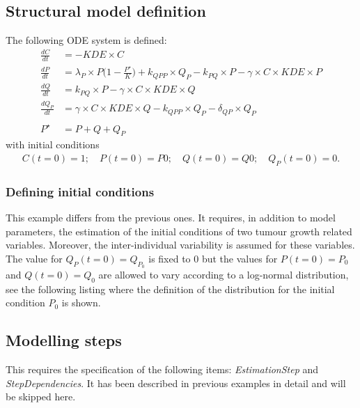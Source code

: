 \subsection{Structural model definition}
The following ODE system is defined:
\begin{align*}
\frac{dC}{dt} &= -\textit{KDE} \times C  \nonumber \\
\frac{dP}{dt} &= \lambda_P \times P \Big( 1 - \frac{P^\star}{K} \Big) + k_{\textit{QPP}} \times Q_P - k_{\textit{PQ}} \times P - \gamma \times C \times \textit{KDE} \times P  \nonumber \\
\frac{dQ}{dt} &= k_{PQ}\times P - \gamma \times C\times \mathit{KDE}\times Q \nonumber \\
\frac{dQ_P}{dt} &= \gamma \times C \times \textit{KDE} \times Q - k_{\textit{QPP}} \times Q_P - \delta_{\textit{QP}} \times Q_P  \nonumber \\ \nonumber \\
P^{\star} &= P + Q + Q_P \nonumber
\end{align*}
with initial conditions
\begin{align*}
C(t=0) = 1; \quad P(t=0) = P0; \quad Q(t=0) = Q0; \quad Q_P(t=0) = 0.  \nonumber
\end{align*}

\subsubsection{Defining initial conditions}
This example differs from the previous ones. It requires, in addition to model parameters, 
the estimation of the initial conditions of two tumour growth related variables. 
Moreover, the inter-individual variability is assumed for these variables.
The value for $Q_P(t=0)=Q_{P_0}$ is fixed to $0$ but the values for $P(t=0)=P_0$ and $Q(t=0)=Q_0$
are allowed to vary according to a log-normal distribution, see the following listing 
 where the definition of the distribution for the 
initial condition $P_0$ is shown.



\subsection{Modelling steps}
This requires the specification of the following items: \textit{EstimationStep} and \textit{StepDependencies}.
It has been described in previous examples in detail and will be skipped here.



